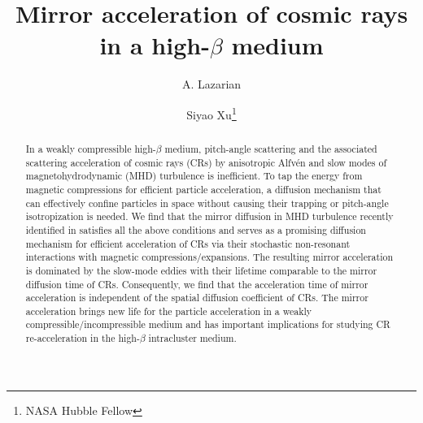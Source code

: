 \documentclass[preprint2,twocolumn,times,tighten]{aastex63}
\begin{document}
\title{Mirror acceleration of cosmic rays in a high-$\beta$ medium}



\author{A. Lazarian}
	\author[0000-0002-0458-7828]{Siyao Xu\footnote{NASA Hubble Fellow}}
	

\begin{abstract}
In a weakly compressible high-$\beta$ medium,
pitch-angle scattering and the associated scattering acceleration of cosmic rays (CRs) by anisotropic 
Alfv\'{e}n and slow modes of 
magnetohydrodynamic (MHD) turbulence
is inefficient. 
To tap the energy from magnetic compressions for efficient particle acceleration, 
a diffusion mechanism that can effectively confine particles in space without causing their trapping 
or pitch-angle isotropization
is needed. 
We find that 
the mirror diffusion in MHD turbulence recently identified in 
\citet{LXm21} 
satisfies all the above conditions and serves as a promising diffusion mechanism for efficient acceleration of CRs via their stochastic 
non-resonant interactions with magnetic compressions/expansions.
The resulting mirror acceleration is dominated by the slow-mode eddies with their lifetime comparable to the mirror diffusion time of CRs.
Consequently, we find that 
the acceleration time of mirror acceleration
is independent of the spatial diffusion coefficient of CRs. 
The mirror acceleration brings new life for the particle acceleration in a weakly compressible/incompressible medium
and has important implications for studying CR re-acceleration in the high-$\beta$ intracluster medium. 



\end{abstract}
\end{document}
